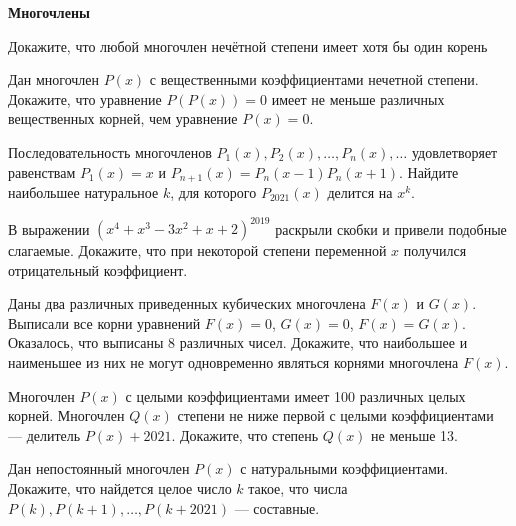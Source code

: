 \documentclass{article}
\begin{document}
    \large

    \begin{center}
        \textbf{Многочлены}
    \end{center}

    \begin{enumerate_boxed}

        \item Докажите, что любой многочлен нечётной степени имеет хотя бы один корень

        \item Дан многочлен $P(x)$ с вещественными коэффициентами нечетной степени.
        Докажите, что уравнение $P(P(x)) = 0$ имеет не меньше различных вещественных корней, чем уравнение $P(x) = 0$.

        \item Последовательность многочленов $P_1(x), P_2(x), \ldots, P_n(x), \ldots$ удовлетворяет равенствам $P_1(x) = x$ и $P_{n+1}(x) = P_n(x - 1)P_n(x + 1)$.
        Найдите наибольшее натуральное $k$, для которого $P_{2021}(x)$ делится на $x^k$.

        \item В выражении $(x^4 + x^3 - 3x^2 + x + 2)^{2019}$ раскрыли скобки и привели подобные слагаемые.
        Докажите, что при некоторой степени переменной $x$ получился отрицательный коэффициент.

        \item Даны два различных приведенных кубических многочлена $F(x)$ и $G(x)$.
        Выписали все корни уравнений $F(x) = 0$, $G(x) = 0$, $F(x) = G(x)$.
        Оказалось, что выписаны 8 различных чисел.
        Докажите, что наибольшее и наименьшее из них не могут одновременно являться корнями многочлена $F(x)$.

        \item Многочлен $P(x)$ с целыми коэффициентами имеет 100 различных целых корней.
        Многочлен $Q(x)$ степени не ниже первой с целыми коэффициентами — делитель $P(x) + 2021$.
        Докажите, что степень $Q(x)$ не меньше 13.

        \item Дан непостоянный многочлен $P(x)$ с натуральными коэффициентами.
        Докажите, что найдется целое число $k$ такое, что числа $P(k), P(k+1), \ldots, P(k+2021)$ — составные.

    \end{enumerate_boxed}
\end{document}
